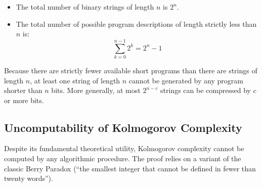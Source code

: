 \begin{itemize}
    \item The total number of binary strings of length $n$ is $2^n$.
    \item The total number of possible program descriptions of length strictly less than $n$ is:
    $$\sum_{k=0}^{n-1} 2^k = 2^n - 1$$
\end{itemize}

Because there are strictly fewer available short programs than there are strings of length $n$, at least one string of length $n$ cannot be generated by any program shorter than $n$ bits. More generally, at most $2^{n-c}$ strings can be compressed by $c$ or more bits.

\subsection{Uncomputability of Kolmogorov Complexity}

Despite its fundamental theoretical utility, Kolmogorov complexity cannot be computed by any algorithmic procedure. The proof relies on a variant of the classic Berry Paradox (``the smallest integer that cannot be defined in fewer than twenty words'').


